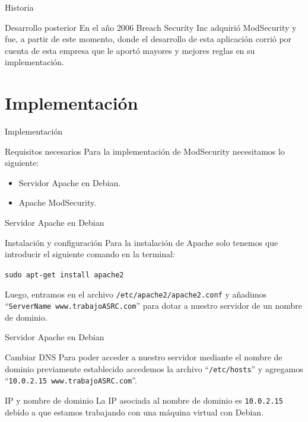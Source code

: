 \documentclass{beamer}
\begin{document}
\begin{frame}{Historia}
	\begin{block}{Desarrollo posterior}
		En el año 2006 Breach Security Inc adquirió ModSecurity y fue, a partir de este momento, donde el desarrollo de esta aplicación corrió por cuenta de esta empresa que le aportó mayores y mejores reglas en su implementación.
	\end{block}
\end{frame}

\section{Implementación}
\begin{frame}{Implementación}
	\begin{block}{Requisitos necesarios}
		Para la implementación de ModSecurity necesitamos lo siguiente:
		\begin{itemize}
			\item Servidor Apache en Debian.
			\item Apache ModSecurity.
		\end{itemize}
	\end{block}
\end{frame}

\begin{frame}{Servidor Apache en Debian}
	\begin{block}{Instalación y configuración}
		Para la instalación de Apache solo tenemos que introducir el siguiente comando en la terminal:
		\begin{center}
			\texttt{sudo apt-get install apache2}
		\end{center}
		Luego, entramos en el archivo \texttt{/etc/apache2/apache2.conf} y añadimos ``\texttt{ServerName www.trabajoASRC.com}'' para dotar a nuestro servidor de un nombre de dominio.
	\end{block}
\end{frame}

\begin{frame}{Servidor Apache en Debian}
\begin{block}{Cambiar DNS}
	Para poder acceder a nuestro servidor mediante el nombre de dominio previamente establecido accedemos la archivo ``\texttt{/etc/hosts}'' y agregamos ``\texttt{10.0.2.15 www.trabajoASRC.com}''.
\end{block}
\begin{alertblock}{IP y nombre de dominio}
	La IP asociada al nombre de dominio es \texttt{10.0.2.15} debido a que estamos trabajando con una máquina virtual con Debian.
\end{alertblock}
\end{frame}
\end{document}
